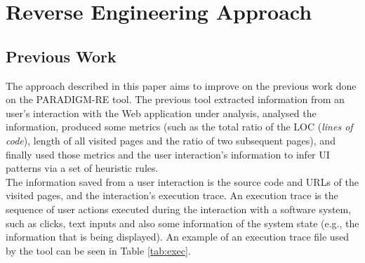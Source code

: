 \documentclass[conference]{IEEEtran}
\begin{document}
\section{Reverse Engineering Approach}\label{sec:re}

\subsection{Previous Work}\label{sec:pw}

The  approach described in this paper aims to improve on the previous work \cite{nabuco2013inferring} done on the PARADIGM-RE tool. The previous tool extracted information from an user's interaction with the Web application under analysis, analysed the information, produced some metrics (such as the total ratio of the LOC (\textit{lines of code}), length of all visited pages and the ratio of two subsequent pages), and finally used those metrics and the user interaction's information to infer UI patterns via a set of heuristic rules. \\
The information saved from a user interaction is the source code and URLs of the visited pages, and the interaction's execution trace. An execution trace is the sequence of user actions executed during the interaction with a software system, such as clicks, text inputs and also some information of the system state (e.g., the information that is being displayed). An example of an execution trace file used by the tool can be seen in Table \ref{tab:exec}.

\begin{table}[!htb]
\caption{Example of an execution trace file.}
\label{tab:exec}
\end{table}
\end{document}
